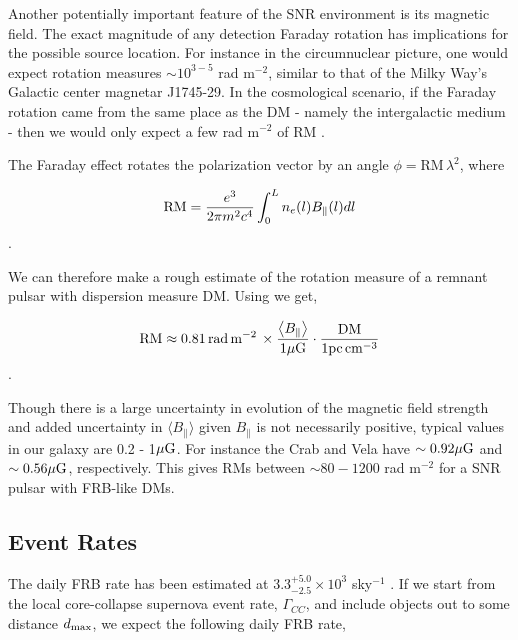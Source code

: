 \documentclass[useAMS,usenatbib]{mn2e}
\begin{document}
Another potentially important feature of the SNR environment is its magnetic
field. 
The exact magnitude of any detection Faraday rotation has implications for the possible source location. For
instance in the circumnuclear picture, one would expect rotation measures 
$\sim10^{3-5}$ rad m$^{-2}$, similar to that of the Milky Way's
Galactic center magnetar J1745-29. In the cosmological scenario, if the Faraday 
rotation
came from the same place as the DM - namely the intergalactic medium -
then we would only expect a few rad m$^{-2}$ of RM \citep{2015A&A...575A.118O}. 

The Faraday effect rotates the polarization vector
by an angle $\phi = $RM$\, \lambda^2$, where

\begin{equation}
\textup{RM} = \frac{e^3}{2\pi m^2 c^4} \int_0^{L} n_e(l) B_\parallel (l) dl
\end{equation}.

We can therefore make a rough estimate of the rotation measure of a remnant 
pulsar with dispersion measure DM. Using 
\cite{2014ira..book.....B} we get,

\begin{equation}
\textup{RM} \approx 0.81\,\textup{rad}  \, \textup{m}^{-2} \, \times \frac{\left < B_{\parallel} \right >}
{1 \mu \rm G} \cdot \frac{\textup{DM}}{1 \textup{pc}\,\textup{cm}^{-3}} 
\end{equation}.

Though there is a large uncertainty in evolution of the magnetic field strength and added
uncertainty in $\langle B_{\parallel} \rangle$ given $B_{\parallel}$ is not necessarily positive, 
typical values in our galaxy are 0.2 - 1$\mu \rm G$. For instance the Crab and Vela have 
$ \sim 0.92 \mu \rm G$ and $\sim 0.56 \mu \rm G$, respectively. 
This gives RMs between $\sim 80-1200$
rad m$^{-2}$ for a SNR pulsar with FRB-like DMs.

\subsection{Event Rates}

The daily FRB rate has been estimated at $3.3^{+5.0}_{-2.5}\times10^3$ sky$^{-1}$ 
\citep{2015arXiv150500834R}. If we start from the local core-collapse supernova
event rate, $\Gamma_{CC}$, and include objects out to some distance $d_{\rm max}$,
we expect the following daily FRB rate, 
\end{document}
